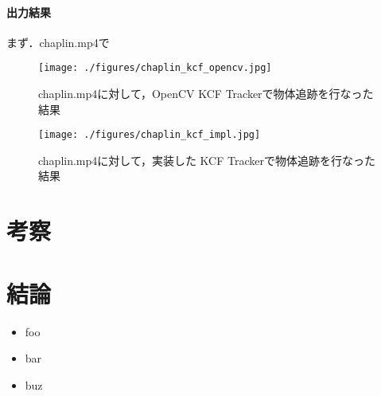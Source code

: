 \documentclass[11pt,a4j]{jarticle}
\begin{document}
    \paragraph{出力結果}
    まず．chaplin.mp4で

    \begin{figure}[hbtp]
      \begin{center}
        \texttt{[image: ./figures/chaplin\_kcf\_opencv.jpg]}
        \caption{chaplin.mp4に対して，OpenCV KCF Trackerで物体追跡を行なった結果}
        \label{fig:AC_PetriNet}
      \end{center}
    \end{figure}

    \begin{figure}[hbtp]
      \begin{center}
        \texttt{[image: ./figures/chaplin\_kcf\_impl.jpg]}
        \caption{chaplin.mp4に対して，実装した KCF Trackerで物体追跡を行なった結果}
        \label{fig:AC_PetriNet}
      \end{center}
    \end{figure}

  \section{考察}
  
  \section{結論}

    \begin{itemize}
      \item foo
      \item bar
      \item buz
    \end{itemize}

\end{document}
